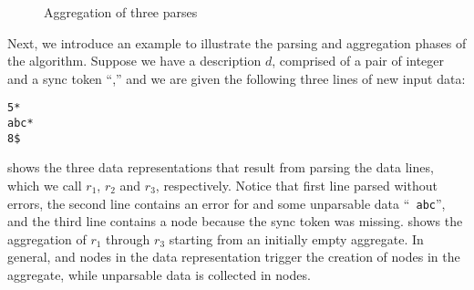 \begin{figure*}[t]
\begin{center}
\caption{Aggregation of three parses}\label{fig:aggregate}
\end{center}
\end{figure*}

Next, we introduce an example to illustrate the parsing and
aggregation phases of the algorithm. 
Suppose we have a description $d$, comprised of a pair of integer and a sync token ``\cd{*},''
and we are given the following three lines of new input data:
{\small
\begin{verbatim}
5*
abc*
8$
\end{verbatim}
}

 shows the three data representations that result
from parsing the data lines, which we call $r_1$, $r_2$ and $r_3$,
respectively. Notice that first line parsed without errors, the second
line contains an error for  and some unparsable data ``{\tt
  abc}'', and the third line contains a  node because the
sync token was missing.   shows the aggregation
of $r_1$ through $r_3$ starting from an initially empty aggregate. In
general,  and  nodes in the data representation
trigger the creation of  nodes in the aggregate, while
unparsable data is collected in  nodes.


%

